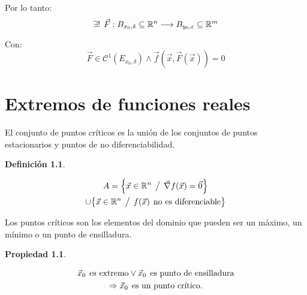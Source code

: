 \documentclass[a5paper,12pt,twoside]{book}
\newtheorem{defn}{{Definición}}[chapter]
\newtheorem{prop}{{Propiedad}}[chapter]
\begin{document}
Por lo tanto:
\begin{equation*}
    \exists ! \hspace{1ex} \Vec{F}: B_{x_0,\delta} \subseteq \mathbb{R}^n \longrightarrow B_{y_0,\varepsilon} \subseteq \mathbb{R}^m
\end{equation*}

Con:
\begin{equation*}
    \Vec{F} \in \mathcal{C}^1(E_{x_0, \delta}) \land \Vec{f}(\Vec{x}, \Vec{F}(\Vec{x}))=0
\end{equation*}


\chapter{Extremos de funciones reales}


El conjunto de puntos críticos es la unión de los conjuntos de puntos estacionarios y puntos de no diferenciabilidad.

\begin{mdframed}[style=DefinitionFrame]
    \begin{defn}
    \end{defn}
    \begin{multline*}
        A = { \left\{ { \Vec{x} \in \mathbb{R}^n \hspace{1ex} \big/ \hspace{1ex} \Vec{\nabla} f(\Vec{x}) = \Vec{0} } \right\} }
        \\
        \cup { \left\{ { \Vec{x} \in \mathbb{R}^n\hspace{1ex} \big/ \hspace{1ex}f(\Vec{x}) \hspace{1ex} \textrm{no es diferenciable} } \right\} }
    \end{multline*}
\end{mdframed}

Los puntos críticos son los elementos del dominio que pueden ser un máximo, un mínimo o un punto de ensilladura.

\begin{mdframed}[style=PropertyFrame]
    \begin{prop}
    \end{prop}
    \begin{gather*}
        \Vec{x}_0 \hspace{1ex} \textrm{es extremo} \lor \Vec{x}_0 \hspace{1ex} \textrm{es punto de ensilladura}
        \\
        \Rightarrow \Vec{x}_0 \hspace{1ex} \textrm{es un punto crítico.}
    \end{gather*}
\end{mdframed}
\end{document}

